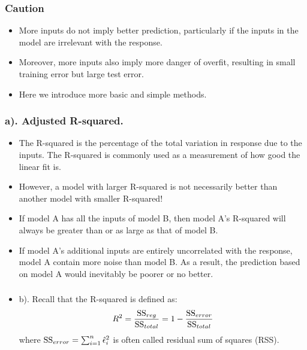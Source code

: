 \documentclass{beamer}
\begin{document}
      \begin{frame}
      	\frametitle{Caution  }
      	\begin{itemize}
      		
      		
      		
      		\item 	More inputs do not imply better prediction, particularly
      		if the inputs in the model are irrelevant with the response.
      		
      		\item	 Moreover, more inputs
      		also imply more danger of overfit, resulting in small training error but large test error.
      		
      		\item	Here we introduce more basic and simple methods.
      		
      	\end{itemize}
      \end{frame}
      
      
      \begin{frame}
      	\frametitle{a). Adjusted R-squared. }
      	\begin{itemize}
      		
      		\item  The R-squared     is the percentage of the
      		total variation in response due to the inputs. 			
      		The R-squared is commonly used as
      		a measurement of how good the linear fit is. 
      		
      		\item However, a model with larger R-squared
      		is not necessarily better than another model with smaller R-squared!
      		
      		\item 
      		If  model A has all the inputs of model B, then model A's R-squared will always be greater than
      		or as large as that of
      		model B.  
      		
      		\item If model A's additional inputs are entirely uncorrelated with the response, model
      		A contain more noise than model B. As a result, the prediction based on model A would
      		inevitably  be poorer or no better.
      		
      	\end{itemize}
      \end{frame}
      
      \begin{frame}
      	\frametitle{   }
	      	\begin{itemize}
      		
      		
      		\item b). 
      		Recall that the R-squared is defined as:
      		$$ R^2= {\hbox{SS}_{reg} \over \hbox{SS}_{total}} = 1- {\hbox{SS}_{error} \over \hbox{SS}_{total}}$$
      		where $\hbox{SS}_{error} = \sum_{i=1}^n \hat \epsilon_i^2$ is often called residual sum of squares (RSS).
      		
      	\end{itemize}
      \end{frame}
      
\end{document}
